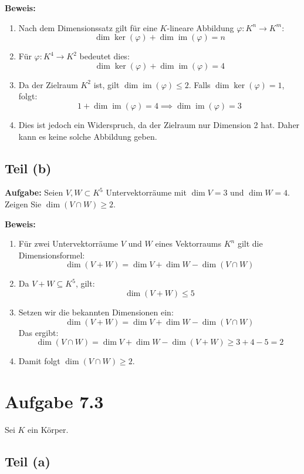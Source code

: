 \documentclass[11pt]{article}
\begin{document}
\textbf{Beweis:}
\begin{enumerate}
    \item Nach dem Dimensionssatz gilt für eine \( K \)-lineare Abbildung \( \varphi: K^n \to K^m \):
    \[
    \dim \ker(\varphi) + \dim \operatorname{im}(\varphi) = n
    \]
    \item Für \( \varphi: K^4 \to K^2 \) bedeutet dies:
    \[
    \dim \ker(\varphi) + \dim \operatorname{im}(\varphi) = 4
    \]
    \item Da der Zielraum \( K^2 \) ist, gilt \( \dim \operatorname{im}(\varphi) \leq 2 \). Falls \( \dim \ker(\varphi) = 1 \), folgt:
    \[
    1 + \dim \operatorname{im}(\varphi) = 4 \implies \dim \operatorname{im}(\varphi) = 3
    \]
    \item Dies ist jedoch ein Widerspruch, da der Zielraum nur Dimension 2 hat. Daher kann es keine solche Abbildung geben.
\end{enumerate}

\subsection*{Teil (b)}

\textbf{Aufgabe:} Seien \( V, W \subset K^5 \) Untervektorräume mit \( \dim V = 3 \) und \( \dim W = 4 \). Zeigen Sie \( \dim (V \cap W) \geq 2 \).

\textbf{Beweis:}
\begin{enumerate}
    \item Für zwei Untervektorräume \( V \) und \( W \) eines Vektorraums \( K^n \) gilt die Dimensionsformel:
    \[
    \dim(V + W) = \dim V + \dim W - \dim (V \cap W)
    \]
    \item Da \( V + W \subseteq K^5 \), gilt:
    \[
    \dim(V + W) \leq 5
    \]
    \item Setzen wir die bekannten Dimensionen ein:
    \[
    \dim(V + W) = \dim V + \dim W - \dim (V \cap W)
    \]
    Das ergibt:
    \[
    \dim(V \cap W) = \dim V + \dim W - \dim(V + W) \geq 3 + 4 - 5 = 2
    \]
    \item Damit folgt \( \dim(V \cap W) \geq 2 \).
\end{enumerate}

\section*{Aufgabe 7.3}

Sei \( K \) ein Körper.

\subsection*{Teil (a)}
\end{document}

